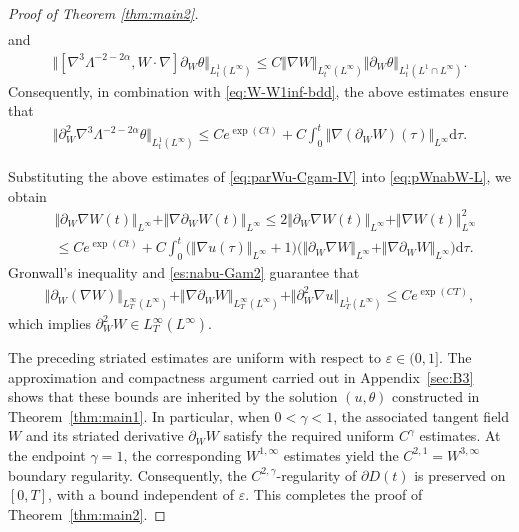\documentclass[reqno,11pt,a4paper]{amsart}
\newcommand{\dd}{\mathrm{d}}
\def \p {\partial}
\begin{document}
\begin{proof}[Proof of Theorem \ref{thm:main2}]
\begin{align*}
\end{align*}
and
\begin{align*}
  \Vert [\nabla^3\Lambda^{-2-2\alpha}, W\cdot\nabla]\p_W\theta\Vert _{L_t^1(L^\infty)}
  \leq C\Vert \nabla W\Vert _{L^\infty_t(L^\infty)} \Vert \p_W\theta\Vert _{L^1_t(L^1\cap L^\infty)}.
\end{align*}
Consequently, in combination with \eqref{eq:W-W1inf-bdd}, the above estimates ensure that
\begin{align*}
  \big\Vert \partial_W^2 \nabla^3 \Lambda^{-2-2\alpha} \theta \big\Vert _{L^1_t(L^\infty)} \leq C e^{\exp(Ct)}
  + C\int_0^t\Vert \nabla (\partial_W W)(\tau)\Vert _{ L^\infty} \dd\tau.
\end{align*}

Substituting the above estimates of \eqref{eq:parWu-Cgam-IV} into \eqref{eq:pWnabW-L}, we obtain
\begin{align*}
  & \Vert  \p_W\nabla W(t)\Vert _{L^\infty} + \Vert \nabla \p_WW(t)\Vert _{L^\infty}
  \leq 2\Vert  \p_W\nabla W(t)\Vert _{L^\infty} + \Vert  \nabla W(t)\Vert ^2_{L^\infty} \\
  & \leq C e^{\exp (Ct)} 
  + C \int_0^t \big(\Vert \nabla u(\tau)\Vert _{L^\infty}+1\big) \big(\Vert  \p_W\nabla W\Vert _{L^\infty} 
  + \Vert \nabla \p_W W\Vert _{L^\infty}\big) \dd\tau .
\end{align*}
Gronwall's inequality and \eqref{es:nabu-Gam2} guarantee that 
\begin{align}\label{eq:es-k=2-IV}
  \Vert  \p_W(\nabla W)\Vert _{L^\infty_T(L^\infty)} + \Vert \nabla \p_W W\Vert _{L^\infty_T(L^\infty)} 
  + \Vert \partial_W^2 \nabla u\Vert _{L^1_T(L^\infty)}  \leq C e^{\exp(CT)} ,
\end{align}
which implies $\p^2_W W \in L^\infty_T(L^{\infty})$.

The preceding striated estimates are uniform with respect to
$\varepsilon\in(0,1]$. The approximation and compactness argument
carried out in Appendix~\ref{sec:B3} shows that these bounds are
inherited by the solution $(u,\theta)$ constructed in
Theorem~\ref{thm:main1}. In particular, when $0<\gamma<1$, the
associated tangent field $W$ and its striated derivative
$\partial_W W$ satisfy the required uniform $C^\gamma$ estimates.
At the endpoint $\gamma=1$, the corresponding $W^{1,\infty}$
estimates yield the $C^{2,1}=W^{3,\infty}$ boundary regularity.
Consequently, the $C^{2,\gamma}$-regularity of $\partial D(t)$ is
preserved on $[0,T]$, with a bound independent of $\varepsilon$.
This completes the proof of Theorem~\ref{thm:main2}.
\end{proof}
\end{document}
